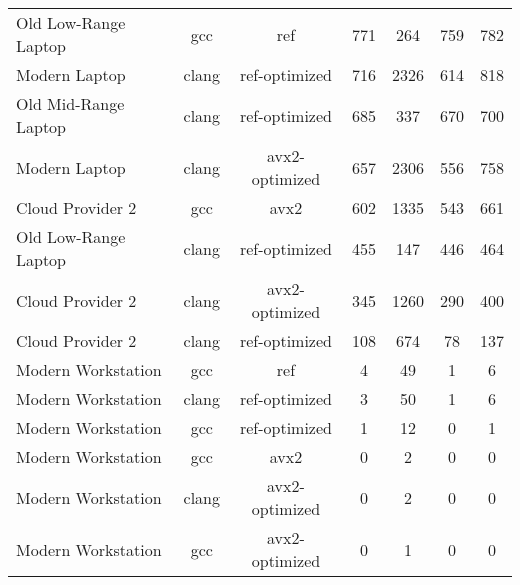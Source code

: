 \begin{table}
\begin{tabularx}{\linewidth}{l c c c c c c}
        Old Low-Range Laptop &                  gcc &                  ref &                  771 &                  264 &                  759 &                  782\\
               Modern Laptop &                clang &        ref-optimized &                  716 &                 2326 &                  614 &                  818\\
        Old Mid-Range Laptop &                clang &        ref-optimized &                  685 &                  337 &                  670 &                  700\\
               Modern Laptop &                clang &       avx2-optimized &                  657 &                 2306 &                  556 &                  758\\
            Cloud Provider 2 &                  gcc &                 avx2 &                  602 &                 1335 &                  543 &                  661\\
        Old Low-Range Laptop &                clang &        ref-optimized &                  455 &                  147 &                  446 &                  464\\
            Cloud Provider 2 &                clang &       avx2-optimized &                  345 &                 1260 &                  290 &                  400\\
            Cloud Provider 2 &                clang &        ref-optimized &                  108 &                  674 &                   78 &                  137\\
          Modern Workstation &                  gcc &                  ref &                    4 &                   49 &                    1 &                    6\\
          Modern Workstation &                clang &        ref-optimized &                    3 &                   50 &                    1 &                    6\\
          Modern Workstation &                  gcc &        ref-optimized &                    1 &                   12 &                    0 &                    1\\
          Modern Workstation &                  gcc &                 avx2 &                    0 &                    2 &                    0 &                    0\\
          Modern Workstation &                clang &       avx2-optimized &                    0 &                    2 &                    0 &                    0\\
          Modern Workstation &                  gcc &       avx2-optimized &                    0 &                    1 &                    0 &                    0\\
        \bottomrule
    \end{tabularx}
\end{table}
